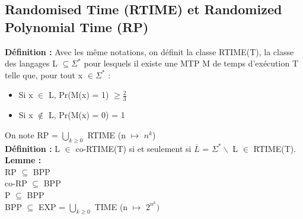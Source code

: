 \documentclass[12pt,a4paper]{article}
\newcommand\tab[1][0.65cm]{\hspace*{#1}}
\begin{document}
\subsection{Randomised Time (RTIME) et Randomized Polynomial Time (RP)}
\textbf{Définition :} Avec les même notations, on définit la classe RTIME(T), la classe des langages L $\subseteq \Sigma^*$ pour lesquels il existe une MTP M de temps d'exécution T telle que, pour tout x $\in \Sigma^*$ :
\begin{itemize}
	\item Si x $\in$ L, Pr(M(x) = 1) $\geq \frac{2}{3}$
	\item Si x $\not\in$ L, Pr(M(x) = 0) = 1
\end{itemize}
On note RP = $\bigcup\limits_{k \geq 0}$ RTIME (n $\longmapsto$ $n^k$)\\
\textbf{Définition :} L $\in$ co-RTIME(T) si et seulement si $\overline{L}$ = $\Sigma^* \backslash$ L $\in$ RTIME(T).\\
\textbf{Lemme :}\\
\tab RP $\subseteq$ BPP\\
\tab co-RP $\subseteq$ BPP\\
\tab P $\subseteq$ BPP\\
\tab BPP $\subseteq$ EXP = $\bigcup\limits_{k \geq 0}$ TIME (n $\longmapsto$ $2^{n^k})$
\end{document}
